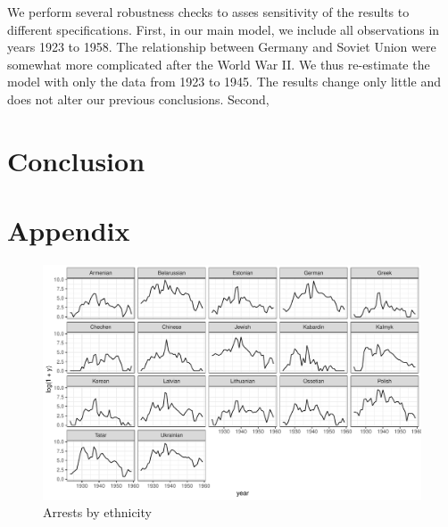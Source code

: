 \documentclass[12pt]{article}
\begin{document}
We perform several robustness checks to asses sensitivity of the results to different specifications. First, in our main model, we include all observations in years 1923 to 1958. The relationship between Germany and Soviet Union were somewhat more complicated after the World War II. We thus re-estimate the model with only the data from 1923 to 1945. The results change only little and does not alter our previous conclusions. Second,    
\section{Conclusion}





\newpage
\section*{Appendix}

\begin{figure}[h]
\centering
\includegraphics[width=\textwidth]{plots/arrests_by_ethnicity.pdf}
\caption{Arrests by ethnicity}
\label{fig:universe}
\end{figure}

\end{document}
